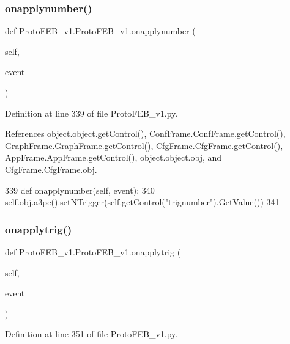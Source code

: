 \subsubsection{\texorpdfstring{onapplynumber()}{onapplynumber()}}
{\footnotesize\ttfamily def Proto\+F\+E\+B\+\_\+v1.\+Proto\+F\+E\+B\+\_\+v1.\+onapplynumber (\begin{DoxyParamCaption}\item[{}]{self,  }\item[{}]{event }\end{DoxyParamCaption})}



Definition at line 339 of file Proto\+F\+E\+B\+\_\+v1.\+py.



References object.\+object.\+get\+Control(), Conf\+Frame.\+Conf\+Frame.\+get\+Control(), Graph\+Frame.\+Graph\+Frame.\+get\+Control(), Cfg\+Frame.\+Cfg\+Frame.\+get\+Control(), App\+Frame.\+App\+Frame.\+get\+Control(), object.\+object.\+obj, and Cfg\+Frame.\+Cfg\+Frame.\+obj.


\begin{DoxyCode}
339     \textcolor{keyword}{def }onapplynumber(self, event):
340         self.obj.a3pe().setNTrigger(self.getControl(\textcolor{stringliteral}{"trignumber"}).GetValue())
341 
\end{DoxyCode}
\mbox{\label{classProtoFEB__v1_1_1ProtoFEB__v1_a5108ef129a2d3cf2415489db2b8ca0ed}} 
\subsubsection{\texorpdfstring{onapplytrig()}{onapplytrig()}}
{\footnotesize\ttfamily def Proto\+F\+E\+B\+\_\+v1.\+Proto\+F\+E\+B\+\_\+v1.\+onapplytrig (\begin{DoxyParamCaption}\item[{}]{self,  }\item[{}]{event }\end{DoxyParamCaption})}



Definition at line 351 of file Proto\+F\+E\+B\+\_\+v1.\+py.



